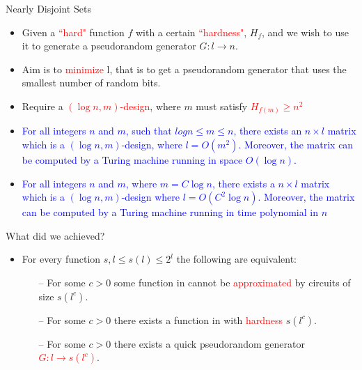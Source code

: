 \documentclass[xcolor={table,dvipsnames,usenames}]{beamer}
\begin{document}
\begin{frame}{Nearly Disjoint Sets}
\begin{itemize}
	\item Given a \textcolor{red}{``hard"} function $f$ with a certain \textcolor{red}{``hardness"}, $H_f$, and we wish to use it to generate a pseudorandom generator $G:l \rightarrow n$.
	\pause
	\item Aim is to \textcolor{red}{minimize} l, that is to get a pseudorandom generator that uses the smallest number of random bits.
	\pause
	\item Require a \textcolor{red}{$(\log n,m)$-design}, where $m$ must satisfy \textcolor{red}{$H_{f(m)} \geq n^2$}
	\pause
	\item \textcolor{blue}{For all integers $n$ and $m$, such that $logn \leq m \leq n$, there exists an $n \times l$ matrix which is a $(\log n,m)$-design, where $l = O(m^2)$. Moreover, the matrix can be computed by a Turing machine running in space $O(\log n)$.}
	\pause
	\item \textcolor{blue}{For all integers $n$ and $m$, where $m=C\log n$, there exists a $n \times l$ matrix which is a $(\log n,m)$-design where $l = O(C^2\log n)$. Moreover, the matrix can be computed by a Turing machine running in time polynomial in $n$}
\end{itemize}
\end{frame}
\begin{frame}{What did we achieved?}
\begin{itemize}
	\item  For every function $s, l \leq s(l) \leq 2^l$ the following are equivalent:
	\pause
	\begin{itemize}
		\item[--] For some $c > 0$ some function in {\EXPTIME} cannot be \textcolor{red}{approximated} by circuits of	size $s(l^c)$.
		\pause
		\item[--] For some $c > 0$ there exists a function in {\EXPTIME} with \textcolor{red}{hardness} $s(l^c)$.
		\pause
		\item[--] For some $c > 0$ there exists a quick pseudorandom generator \textcolor{red}{$G:l \rightarrow s(l^c)$}.
	\end{itemize}
\end{itemize}
\end{frame}
\end{document}
